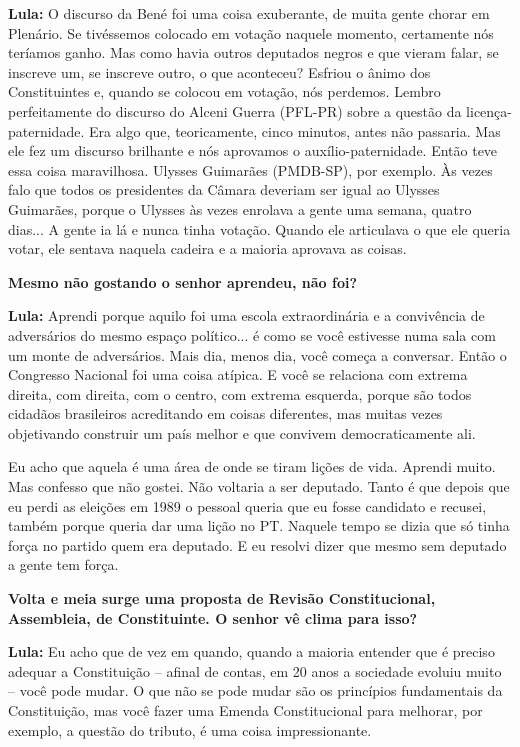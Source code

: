 \textbf{Lula:} O discurso da Bené foi uma coisa exuberante, de muita
gente chorar em Plenário. Se tivéssemos colocado em votação naquele
momento, certamente nós teríamos ganho. Mas como havia outros deputados
negros e que vieram falar, se inscreve um, se inscreve outro, o que
aconteceu? Esfriou o ânimo dos Constituintes e, quando se colocou em
votação, nós perdemos. Lembro perfeitamente do discurso do Alceni Guerra
(PFL-PR) sobre a questão da licença-paternidade. Era algo que,
teoricamente, cinco minutos, antes não passaria. Mas ele fez um discurso
brilhante e nós aprovamos o auxílio-paternidade. Então teve essa coisa
maravilhosa. Ulysses Guimarães (PMDB-SP), por exemplo. Às vezes falo que
todos os presidentes da Câmara deveriam ser igual ao Ulysses Guimarães,
porque o Ulysses às vezes enrolava a gente uma semana, quatro dias... A
gente ia lá e nunca tinha votação. Quando ele articulava o que ele
queria votar, ele sentava naquela cadeira e a maioria aprovava as
coisas.

\textbf{Mesmo não gostando o senhor aprendeu, não foi?}

\textbf{Lula:} Aprendi porque aquilo foi uma escola extraordinária e a
convivência de adversários do mesmo espaço político... é como se você
estivesse numa sala com um monte de adversários. Mais dia, menos dia,
você começa a conversar. Então o Congresso Nacional foi uma coisa
atípica. E você se relaciona com extrema direita, com direita, com o
centro, com extrema esquerda, porque são todos cidadãos brasileiros
acreditando em coisas diferentes, mas muitas vezes objetivando construir
um país melhor e que convivem democraticamente ali.

Eu acho que aquela é uma área de onde se tiram lições de vida. Aprendi
muito. Mas confesso que não gostei. Não voltaria a ser deputado. Tanto é
que depois que eu perdi as eleições em 1989 o pessoal queria que eu
fosse candidato e recusei, também porque queria dar uma lição no PT.
Naquele tempo se dizia que só tinha força no partido quem era deputado.
E eu resolvi dizer que mesmo sem deputado a gente tem força.

\textbf{Volta e meia surge uma proposta de Revisão Constitucional,
Assembleia, de Constituinte. O senhor vê clima para isso?}

\textbf{Lula:} Eu acho que de vez em quando, quando a maioria entender
que é preciso adequar a Constituição -- afinal de contas, em 20 anos a
sociedade evoluiu muito -- você pode mudar. O que não se pode mudar são
os princípios fundamentais da Constituição, mas você fazer uma Emenda
Constitucional para melhorar, por exemplo, a questão do tributo, é uma
coisa impressionante.

